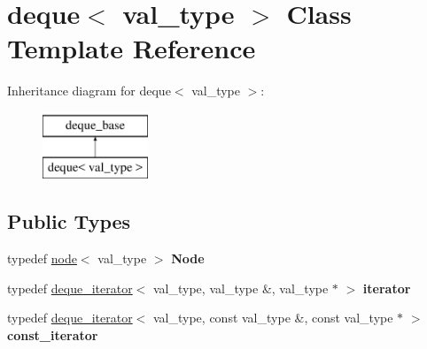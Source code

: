 \hypertarget{classdeque}{}\section{deque$<$ val\+\_\+type $>$ Class Template Reference}
\label{classdeque}
Inheritance diagram for deque$<$ val\+\_\+type $>$\+:\begin{figure}[H]
\begin{center}
\leavevmode
\includegraphics[height=2.000000cm]{classdeque}
\end{center}
\end{figure}
\subsection*{Public Types}
\begin{DoxyCompactItemize}
\item 
\hypertarget{classdeque_afabb1a53a41a29ed46d83221079cb5e5}{}\label{classdeque_afabb1a53a41a29ed46d83221079cb5e5} 
typedef \hyperlink{structnode}{node}$<$ val\+\_\+type $>$ {\bfseries Node}
\item 
\hypertarget{classdeque_a6af6d2c157f9cb9b85ee9a9b02ff083e}{}\label{classdeque_a6af6d2c157f9cb9b85ee9a9b02ff083e} 
typedef \hyperlink{structdeque__iterator}{deque\+\_\+iterator}$<$ val\+\_\+type, val\+\_\+type \&, val\+\_\+type $\ast$ $>$ {\bfseries iterator}
\item 
\hypertarget{classdeque_a1244237c757ffeb402c7fe2db5a70083}{}\label{classdeque_a1244237c757ffeb402c7fe2db5a70083} 
typedef \hyperlink{structdeque__iterator}{deque\+\_\+iterator}$<$ val\+\_\+type, const val\+\_\+type \&, const val\+\_\+type $\ast$ $>$ {\bfseries const\+\_\+iterator}
\end{DoxyCompactItemize}
